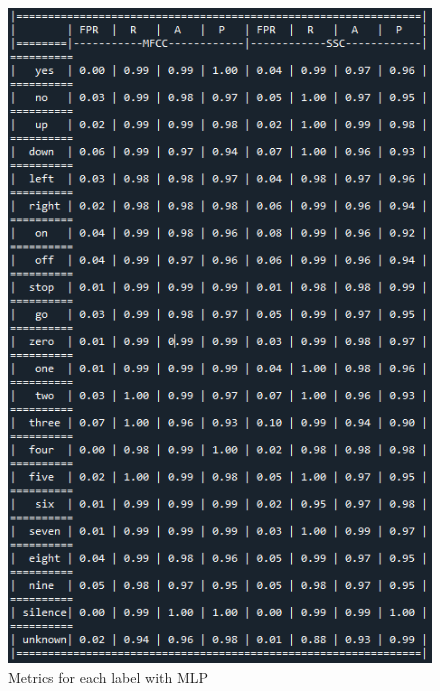 \begin{appendices}
\begin{figure}[h!]
    \centering
    \includegraphics[width=1\textwidth]{chapters/pictures/table_mlp.PNG}
    \caption{Metrics for each label with MLP}
    \label{fig:table_mlp}
\end{figure}
\newpage
\begin{figure}[h!]
    \centering

\end{figure}
\end{appendices}
